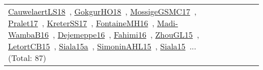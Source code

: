 {\begin{longtable}{lp{3cm}>{\raggedright\arraybackslash}p{6cm}>{\raggedright\arraybackslash}p{6cm}>{\raggedright\arraybackslash}p{8cm}}
\href{../works/CauwelaertLS18.pdf}{CauwelaertLS18}~\cite{CauwelaertLS18}, \href{../works/GokgurHO18.pdf}{GokgurHO18}~\cite{GokgurHO18}, \href{../works/MossigeGSMC17.pdf}{MossigeGSMC17}~\cite{MossigeGSMC17}, \href{../works/Pralet17.pdf}{Pralet17}~\cite{Pralet17}, \href{../works/KreterSS17.pdf}{KreterSS17}~\cite{KreterSS17}, \href{../works/FontaineMH16.pdf}{FontaineMH16}~\cite{FontaineMH16}, \href{../works/Madi-WambaB16.pdf}{Madi-WambaB16}~\cite{Madi-WambaB16}, \href{../works/Dejemeppe16.pdf}{Dejemeppe16}~\cite{Dejemeppe16}, \href{../works/Fahimi16.pdf}{Fahimi16}~\cite{Fahimi16}, \href{../works/ZhouGL15.pdf}{ZhouGL15}~\cite{ZhouGL15}, \href{../works/LetortCB15.pdf}{LetortCB15}~\cite{LetortCB15}, \href{../works/Siala15a.pdf}{Siala15a}~\cite{Siala15a}, \href{../works/SimoninAHL15.pdf}{SimoninAHL15}~\cite{SimoninAHL15}, \href{../works/Siala15.pdf}{Siala15}~\cite{Siala15}... (Total: 87)\\

\end{longtable}}
